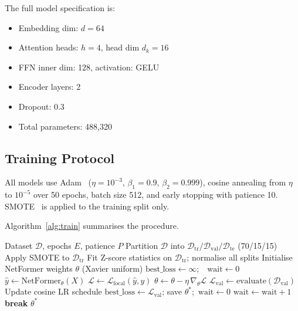 \documentclass[conference]{IEEEtran}
\begin{document}
The full model specification is:
\begin{itemize}
	\item Embedding dim: $d = 64$
	\item Attention heads: $h = 4$, head dim $d_k = 16$
	\item FFN inner dim: 128, activation: GELU
	\item Encoder layers: 2
	\item Dropout: 0.3
	\item Total parameters: 488,320
\end{itemize}

\subsection{Training Protocol}

All models use Adam~\cite{ref:kingma2015}
($\eta = 10^{-3}$, $\beta_1 = 0.9$, $\beta_2 = 0.999$),
cosine annealing from $\eta$ to $10^{-5}$ over 50 epochs,
batch size 512, and early stopping with patience 10.
SMOTE~\cite{ref:chawla2002} is applied to the training split only.

Algorithm~\ref{alg:train} summarises the procedure.

\begin{algorithm}[h]
	\caption{NetFormer Training}
	\label{alg:train}
	\begin{algorithmic}[1]
		\REQUIRE Dataset $\mathcal{D}$, epochs $E$, patience $P$
		\STATE Partition $\mathcal{D}$ into $\mathcal{D}_\text{tr}/
			\mathcal{D}_\text{val}/\mathcal{D}_\text{te}$ (70/15/15)
		\STATE Apply SMOTE to $\mathcal{D}_\text{tr}$
		\STATE Fit Z-score statistics on $\mathcal{D}_\text{tr}$;
		normalise all splits
		\STATE Initialise NetFormer weights $\theta$ (Xavier uniform)
		\STATE $\text{best\_loss} \leftarrow \infty$;\ \
		$\text{wait} \leftarrow 0$
		\STATE $\hat{y} \leftarrow \text{NetFormer}_\theta(X)$
		\STATE $\mathcal{L} \leftarrow
			\mathcal{L}_\text{focal}(\hat{y}, y)$
		\hfill{}
		\STATE $\theta \leftarrow \theta -
			\eta\,\nabla_\theta\mathcal{L}$
		\ENDFOR
		\STATE $\mathcal{L}_\text{val} \leftarrow
			\text{evaluate}(\mathcal{D}_\text{val})$
		\STATE Update cosine LR schedule
		\STATE $\text{best\_loss} \leftarrow \mathcal{L}_\text{val}$;
		save $\theta^*$;\ $\text{wait} \leftarrow 0$
		\ELSE
		\STATE $\text{wait} \leftarrow \text{wait} + 1$
		\STATE \textbf{break}
		\ENDIF
		\ENDIF
		\ENDFOR
		\RETURN $\theta^*$
	\end{algorithmic}
\end{algorithm}
\end{document}
